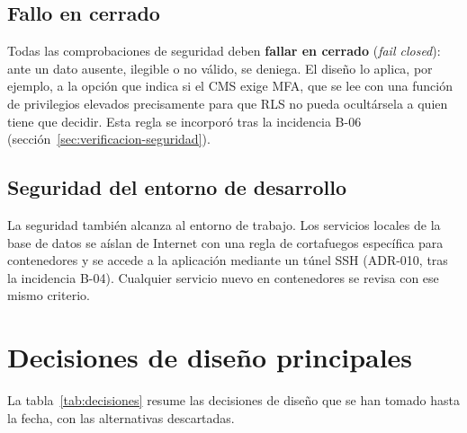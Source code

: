 \subsection{Fallo en cerrado}

Todas las comprobaciones de seguridad deben \textbf{fallar en cerrado}
(\textit{fail closed}): ante un dato ausente, ilegible o no válido, se
deniega. El diseño lo aplica, por ejemplo, a la opción que indica si el CMS
exige MFA, que se lee con una función de privilegios elevados precisamente
para que RLS no pueda ocultársela a quien tiene que decidir. Esta regla se
incorporó tras la incidencia B-06 (sección~\ref{sec:verificacion-seguridad}).

\subsection{Seguridad del entorno de desarrollo}

La seguridad también alcanza al entorno de trabajo. Los servicios locales de
la base de datos se aíslan de Internet con una regla de cortafuegos
específica para contenedores y se accede a la aplicación mediante un túnel
SSH (ADR-010, tras la incidencia B-04). Cualquier servicio nuevo en
contenedores se revisa con ese mismo criterio.

\section{Decisiones de diseño principales}
\label{sec:decisiones}

La tabla~\ref{tab:decisiones} resume las decisiones de diseño que se han
tomado hasta la fecha, con las alternativas descartadas.

